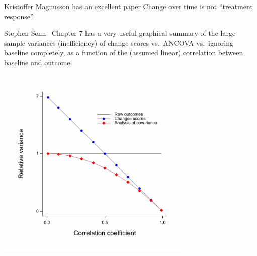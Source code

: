 Kristoffer Magnusson has an excellent paper
\href{http://rpsychologist.com/treatment-response-subgroup}{Change
  over time is not ``treatment response''}
  
Stephen Senn~\cite{sensta} Chapter 7 has a very useful graphical
summary of the large-sample variances (inefficiency) of change scores
vs.\ ANCOVA vs.\ ignoring baseline completely, as a function of the
(assumed linear) correlation between baseline and outcome.  

\centerline{\includegraphics[width=0.7\textwidth]{sennChange.jpg}}

